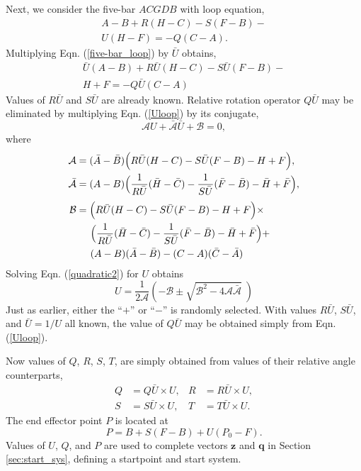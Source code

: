 \documentclass[journal]{IEEEtran}
\def\*#1{\bar{#1}} %
\begin{document}
Next, we consider the five-bar $ACGDB$ with loop equation,
\begin{align}
A-B + R(H-C) - S(F-B) - \nonumber\\
U(H-F) = -Q(C-A). \label{five-bar_loop}
\end{align}
Multiplying Eqn. (\ref{five-bar_loop}) by $\*U$ obtains,
\begin{align}
\*U(A-B) + R\*U(H-C) - S\*U(F-B) - \nonumber\\
H+F = -Q\*U(C-A) \label{Uloop}
\end{align}
Values of $R\*U$ and $S\*U$ are already known.  
Relative rotation operator $Q\*U$ may be eliminated by multiplying Eqn. (\ref{Uloop}) by its conjugate,
\begin{equation}
\mathcal{A}U + \*{\mathcal{A}}\*U + \mathcal{B} = 0, \label{quadratic2}
\end{equation}
where
\begin{align}
\mathcal{A} &= (\*A-\*B) \Big( R\*U(H-C) - S\*U(F-B) - H+F \Big), \nonumber\\
\*{\mathcal{A}} &= (A-B) \Big( \frac{1}{R\*U}(\*H-\*C) - \frac{1}{S\*U}(\*F-\*B) - \*H+\*F \Big), \nonumber\\[1mm]
\mathcal{B} &= \Big( R\*U(H-C) - S\*U(F-B) - H+F \Big) \times \nonumber\\
&\hspace{5mm} \Big( \frac{1}{R\*U}(\*H-\*C) - \frac{1}{S\*U}(\*F-\*B) - \*H+\*F \Big) + \nonumber\\
&\hspace{5mm} (A-B)(\*A-\*B) - (C-A)(\*C-\*A)
\end{align}
Solving Eqn. (\ref{quadratic2}) for $U$ obtains
\begin{equation}
U = \frac{1}{2\mathcal{A}}\left( -\mathcal{B} \pm \sqrt{\mathcal{B}^2 - 4\mathcal{A}\*{\mathcal{A}} }\; \right)
\end{equation}
Just as earlier, either the ``$+$'' or ``$-$'' is randomly selected.
With values $R\*U$, $S\*U$, and $\*U = 1/U$ all known, the value of $Q\*U$ may be obtained simply from Eqn. (\ref{Uloop}).

Now values of $Q$, $R$, $S$, $T$, are simply obtained from values of their relative angle counterparts,
\begin{align}
Q &= Q\*U \times U, & R &= R\*U \times U, \nonumber\\
S &= S\*U \times U, & T &= T\*U \times U.
\end{align}
The end effector point $P$ is located at
\begin{equation}
P = B + S(F-B) + U(P_0-F).
\end{equation}
Values of $U$, $Q$, and $P$ are used to complete vectors $\mathbf{z}$ and $\mathbf{q}$ in Section \ref{sec:start_sys}, defining a startpoint and start system.
\end{document}
